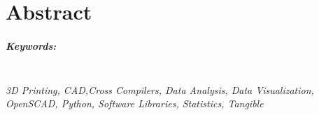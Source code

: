 

\begingroup
\let\clearpage\relax
\let\cleardoublepage\relax
\let\cleardoublepage\relax

\chapter*{Abstract} %

\lipsum[1-2]

\endgroup			

\paragraph{Keywords:}\mbox{}\\
\textit{3D Printing, CAD,Cross Compilers, Data Analysis, Data Visualization,
OpenSCAD, Python, Software Libraries, Statistics, Tangible}

\vfill
